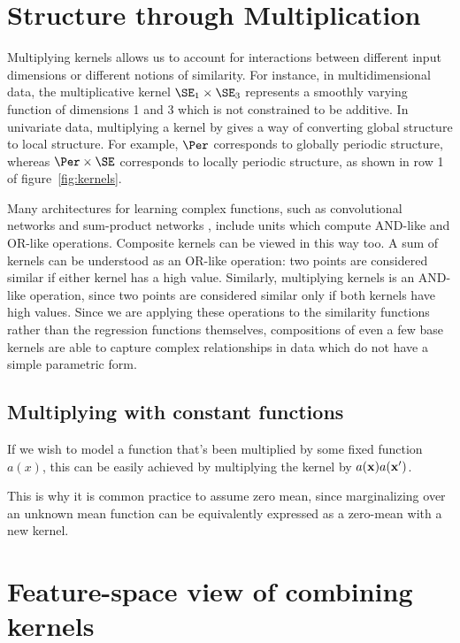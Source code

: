 \section{Structure through Multiplication}

Multiplying kernels allows us to account for interactions between different input dimensions or different notions of similarity. 
For instance, in multidimensional data, the multiplicative kernel $\SE_1 \times \SE_3$ represents a smoothly varying function of dimensions 1 and 3 which is not constrained to be additive.
In univariate data, multiplying a kernel by \kSE{} gives a way of converting global structure to local structure. 
For example, $\Per$ corresponds to globally periodic structure, whereas $\Per \times \SE$ corresponds to locally periodic structure, as shown in row 1 of figure~\ref{fig:kernels}.

Many architectures for learning complex functions, such as convolutional networks \cite{lecun1989backpropagation} and sum-product networks \cite{poon2011sum}, include units which compute AND-like and OR-like operations.
Composite kernels can be viewed in this way too. A sum of kernels can be understood as an OR-like operation: two points are considered similar if either kernel has a high value.
Similarly, multiplying kernels is an AND-like operation, since two points are considered similar only if both kernels have high values.
Since we are applying these operations to the similarity functions rather than the regression functions themselves, compositions of even a few base kernels are able to capture complex relationships in data which do not have a simple parametric form.




\subsection{Multiplying with constant functions}

If we wish to model a function that's been multiplied by some fixed function $a(x)$, this can be easily achieved by multiplying the kernel by $a({\bf{x}}) a({\bf{x}}')$.

This is why it is common practice to assume zero mean, since marginalizing over an unknown mean function can be equivalently expressed as a zero-mean \gp{} with a new kernel.


\section{Feature-space view of combining kernels}

